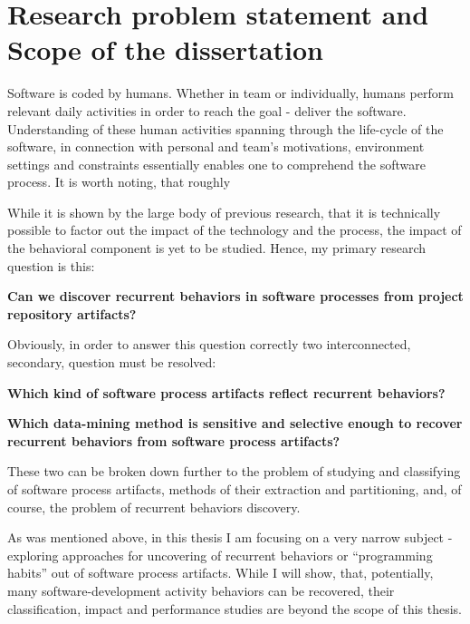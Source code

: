 \section{Research problem statement and Scope of the dissertation}
Software is coded by humans. Whether in team or individually, humans perform relevant 
daily activities in order to reach the goal - deliver the software. Understanding of these
human activities spanning through the life-cycle of the software, in connection with personal 
and team's motivations, environment settings and constraints essentially enables one to
comprehend the software process. It is worth noting, that roughly 


While it is shown by the large body of previous research, that it is technically possible 
to factor out the impact of the technology and the process, the impact of the behavioral 
component is yet to be studied. Hence, my primary research question is this:
\begin{myindentpar}{0.07\linewidth}
 \textbf{Can we discover recurrent behaviors in software processes from project
  repository artifacts?}
\end{myindentpar}

Obviously, in order to answer this question correctly two interconnected, secondary, question must be resolved:
\begin{myindentpar}{0.07\linewidth}
 \textbf{Which kind of software process artifacts reflect recurrent behaviors?}
\end{myindentpar}
\begin{myindentpar}{0.07\linewidth}
 \textbf{Which data-mining method is sensitive and selective enough to recover recurrent behaviors
from software process artifacts?}
\end{myindentpar}
These two can be broken down further to the problem of studying and classifying of software process artifacts,
methods of their extraction and partitioning, and, of course, the problem of recurrent behaviors discovery.

As was mentioned above, in this thesis I am focusing on a very narrow subject - exploring approaches
for uncovering of recurrent behaviors or ``programming habits'' out of software process artifacts.
While I will show, that, potentially, many software-development activity behaviors can be recovered,
their classification, impact and performance studies are beyond the scope of this thesis.

